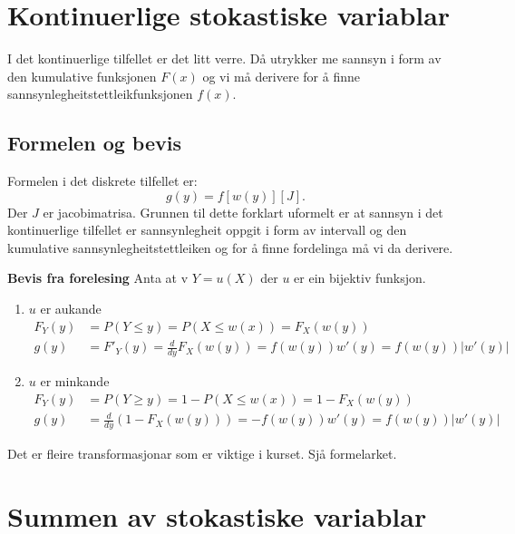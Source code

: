 \section{Kontinuerlige stokastiske variablar}
I det kontinuerlige tilfellet er det litt verre. Då utrykker me sannsyn i form av den kumulative funksjonen $F(x)$ og vi må derivere for å finne sannsynlegheitstettleikfunksjonen $f(x)$.

\subsection{Formelen og bevis}
Formelen i det diskrete tilfellet er:
\begin{equation}
    g(y) = f[w(y)][J].
\end{equation}
Der $J$ er jacobimatrisa. Grunnen til dette forklart uformelt er at sannsyn i det kontinuerlige tilfellet er sannsynlegheit oppgit i form av intervall og den kumulative sannsynlegheitstettleiken og for å finne fordelinga må vi da derivere. 

\textbf{Bevis fra forelesing}
Anta at v $Y = u(X)$ der $u$ er ein bijektiv funksjon.

\begin{enumerate}
    \item $u$ er aukande
        \begin{equation}
            \begin{split}
                F_Y(y) & = P(Y \leq y) = P(X \leq w(x)) = F_X(w(y)) \\
                g(y) & = F'_Y(y) = \frac{d}{dy}F_X(w(y)) = f(w(y))w'(y) = f(w(y))|w'(y)|
            \end{split}
        \end{equation}
    \item $u$ er minkande
        \begin{equation}
            \begin{split}
                F_Y(y) & = P(Y \geq y) = 1 - P(X \leq w(x)) = 1 - F_X(w(y)) \\
                g(y) & = \frac{d}{dy}(1 - F_X(w(y))) = -f(w(y))w'(y) =  f(w(y))|w'(y)|
            \end{split}
        \end{equation}
\end{enumerate}

Det er fleire transformasjonar som er viktige i kurset. Sjå formelarket.

\section{Summen av stokastiske variablar}

